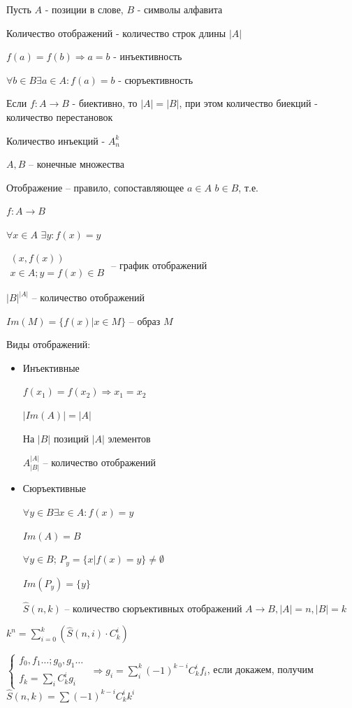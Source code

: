 \documentclass[14pt, letter paper]{article}
\begin{document}
Пусть $A$ - позиции в слове, $B$ - символы алфавита

Количество отображений - количество строк длины $|A|$

$f(a) = f(b) \Rightarrow a = b$ - инъективность

$\forall b \in B \exists a \in A: f(a) = b$ - сюръективность

Если $f: A \rightarrow B$ - биективно, то $|A| = |B|$, при этом количество биекций - количество перестановок

Количество инъекций - $A_n^k$

$A, B$ -- конечные множества 

Отображение -- правило, сопоставляющее $a \in A$ $b \in B$, т.е. 

$f: A \rightarrow B$

$\forall x \in A$ $\exists y : f(x) = y$

$\begin{gathered}
    (x, f(x)) \\
    x \in A; y = f(x) \in B
\end{gathered}$
-- график отображений

$|B|^{|A|}$ -- количество отображений

$Im(M) = \{ f(x) | x \in M\}$ -- образ $M$

Виды отображений:

\begin{itemize}
    \item Инъективные

    $f(x_1) = f(x_2) \Rightarrow x_1 = x_2$

    $|Im(A)| = |A|$

    На $|B|$ позиций $|A|$ элементов

    $A_{|B|}^{|A|}$ -- количество отображений

    \item Сюръективные

    $\forall y \in B \exists x \in A: f(x) = y$

    $Im(A) = B$

    $\forall y \in B$; $P_y = \{ x | f(x) = y\} \neq \emptyset$

    $Im(P_y) = \{y\}$

    $\hat{S} (n, k)$ -- количество сюръективных отображений $A \rightarrow B, |A| = n, |B| = k$
\end{itemize}

$k^n = \sum\limits^k_{i=0} (\hat{S}(n, i) \cdot C_k^i)$

$\begin{cases}
    f_0, f_1 \ldots; g_0, g_1 \ldots \\
    f_k = \sum\limits_i C_k^i g_i
\end{cases}$
$\Rightarrow g_i = \sum\limits_i^k (-1)^{k-i} C_k^i f_i$, если докажем, получим $\hat{S}(n,k) = \sum (-1)^{k-i} C_k^i k^i$
\end{document}
